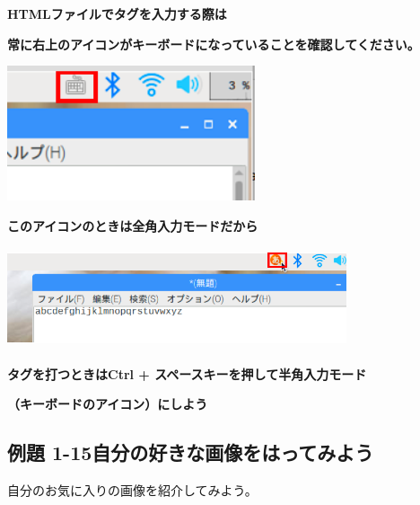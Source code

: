 \documentclass[a4paper,12pt]{jarticle}
\begin{document}
{\centering\bfseries
  HTMLファイルでタグを入力する際は
  \par}

{\centering\bfseries
  常に右上のアイコンがキーボードになっていることを確認してください。
  \par}

\centering
\includegraphics[width=7.301cm,height=3.976cm]{textbook-img159.png}





\bigskip

\bigskip

\bigskip

\bigskip


{\centering\bfseries
  このアイコンのときは全角入力モードだから
  \par}

\centering
\includegraphics[width=10.013cm,height=2.972cm]{textbook-img160.png}


\bigskip


\bigskip

{\centering\bfseries
  タグを打つときはCtrl +
  スペースキーを押して半角入力モード
  \par}

{\centering\bfseries
  （キーボードのアイコン）にしよう
  \par}

\clearpage
\flushleft
\subsection{例題
  1-15自分の好きな画像をはってみよう}
自分のお気に入りの画像を紹介してみよう。
\end{document}
